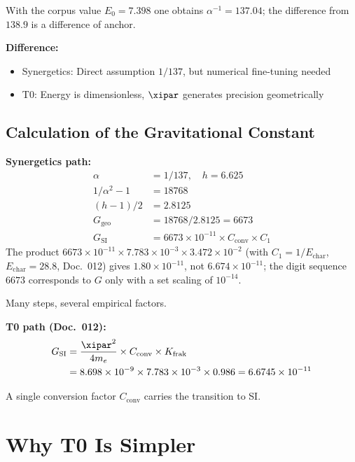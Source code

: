 	With the corpus value $E_0 = 7.398$ one obtains $\alpha^{-1} = 137.04$; the difference from $138.9$ is a difference of anchor.
	
	\textbf{Difference:}
	\begin{itemize}
		\item Synergetics: Direct assumption $1/137$, but numerical fine-tuning needed
		\item T0: Energy is dimensionless, $\xipar$ generates precision geometrically
	\end{itemize}
	
	\subsection{Calculation of the Gravitational Constant}
	
	\textbf{Synergetics path:}
	\begin{align}
		\alpha &= 1/137, \quad h = 6.625 \\
		1/\alpha^2 - 1 &= 18768 \\
		(h-1)/2 &= 2.8125 \\
		G_{\text{geo}} &= 18768 / 2.8125 = 6673 \\
		G_{\text{SI}} &= 6673 \times 10^{-11} \times C_{\text{conv}} \times C_1
	\end{align}
	The product $6673\times10^{-11}\times7.783\times10^{-3}\times3.472\times10^{-2}$ (with $C_1 = 1/E_{\text{char}}$, $E_{\text{char}} = 28.8$, Doc.~012) gives $1.80\times10^{-11}$, not $6.674\times10^{-11}$; the digit sequence $6673$ corresponds to $G$ only with a set scaling of $10^{-14}$.
	
	Many steps, several empirical factors.
	
	\textbf{T0 path (Doc.~012):}
	\begin{align}
		G_{\text{SI}} &= \frac{\xipar^2}{4m_e} \times C_{\text{conv}} \times K_{\text{frak}} \\
		&= 8.698 \times 10^{-9} \times 7.783 \times 10^{-3} \times 0.986 = 6.6745 \times 10^{-11}
	\end{align}
	
	A single conversion factor $C_{\text{conv}}$ carries the transition to SI.
	
	\section{Why T0 Is Simpler}
	
